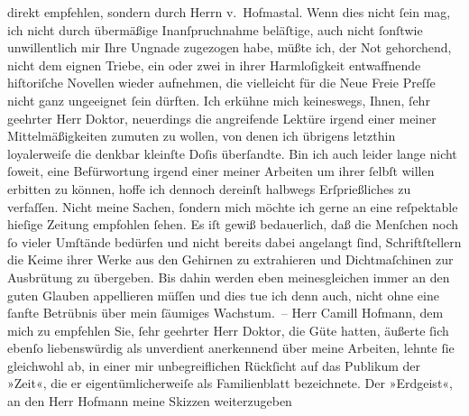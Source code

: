 \begin{ledgroupsized}[t]{13cm}
               direkt empfehlen, sondern durch Herrn v. Hofma{\geminationn}stal. Wenn dies nicht ſein mag, ich nicht durch
               übermäßige Inanſpruchnahme beläſtige, auch nicht {\pb}ſonſtwie unwillentlich mir Ihre Ungnade
               zugezogen habe, müßte ich, der Not gehorchend, nicht dem eignen Triebe, ein oder zwei
               in ihrer Harmloſigkeit entwaffnende hiſtoriſche Novellen wieder aufnehmen, die
               vielleicht für die Neue Freie Preſſe nicht ganz
               ungeeignet ſein dürften. Ich erkühne mich keineswegs, Ihnen, ſehr geehrter Herr
               Doktor, neuerdings die angreifende Lektüre irgend einer meiner Mittelmäßigkeiten
               zumuten zu wollen, von denen ich übrigens letzthin loyalerweiſe die denkbar kleinſte
               Doſis überſandte. Bin ich auch leider lange nicht ſoweit, eine Befürwortung irgend
               einer meiner Arbeiten um ihrer ſelbſt willen erbitten zu können, hoffe ich dennoch
               dereinſt halbwegs Erſprießliches zu verfaſſen. Nicht meine Sachen, {\pb}ſondern mich möchte ich gerne an eine
               reſpektable hieſige Zeitung empfohlen ſehen. Es iſt gewiß bedauerlich, daß die
               Menſchen noch ſo vieler Umſtände bedürfen und nicht bereits dabei angelangt ſind,
               Schriftſtellern die Keime ihrer Werke aus den Gehirnen zu extrahieren und
               Dichtmaſchinen zur Ausbrütung zu übergeben. Bis dahin werden eben meinesgleichen
               immer an den guten Glauben appellieren müſſen und dies tue ich denn auch, nicht ohne
               eine ſanfte Betrübnis über mein ſäumiges Wachstum. – Herr Camill Hofmann, dem mich zu empfehlen Sie, ſehr geehrter Herr
               Doktor, die Güte hatten, äußerte ſich ebenſo liebenswürdig als unverdient anerkennend
               über meine Arbeiten, lehnte ſie gleichwohl ab, in einer {\pb}mir unbegreiflichen Rückſicht auf das
               Publikum der »Zeit«, die er eigentümlicherweiſe
               als Familienblatt bezeichnete. Der »Erdgeist«, an
               den Herr Hofmann meine Skizzen weiterzugeben

\end{ledgroupsized}
